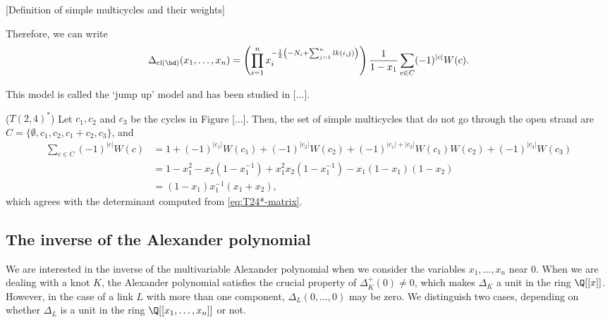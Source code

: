 \documentclass[11pt,e-only]{amsart}
\begin{document}
[Definition of simple multicycles and their weights]

Therefore, we can write
\begin{equation}
    \Delta_{\mathrm{cl}(\bd)}(x_1,\dots,x_n) = \left(\prod_{i=1}^n x_i^{-\frac{1}{2}\left(-N_i+\sum_{j=1}^n lk(i,j)\right)}\right) \frac{1}{1-x_1} \sum_{c\in C} (-1)^{|c|} W(c).
\end{equation}

This model is called the `jump up' model and has been studied in [...].

\begin{example}\label{ex:T24*-cycles} ($T(2,4)^*$) Let $c_1,c_2$ and $c_3$ be the cycles in Figure [...]. Then, the set of simple multicycles that do not go through the open strand are $C=\{\emptyset,c_1,c_2,c_1+c_2,c_3\}$, and
\begin{equation*}
\begin{split}
    \sum_{c\in C} (-1)^{|c|}W(c)&=1+(-1)^{|c_1|}W(c_1)+(-1)^{|c_2|}W(c_2)+(-1)^{|c_1|+|c_2|}W(c_1)W(c_2)+(-1)^{|c_3|}W(c_3)
    \\&=1-x_1^2-x_2(1-x_1^{-1})+x_1^2x_2(1-x_1^{-1})-x_1(1-x_1)(1-x_2)\\&=(1-x_1)x_1^{-1}(x_1+x_2),
\end{split}
\end{equation*}
which agrees with the determinant computed from \cref{eq:T24*-matrix}.
\end{example}

\subsection{The inverse of the Alexander polynomial}

We are interested in the inverse of the multivariable Alexander polynomial when we consider the variables $x_1,\dots,x_n$ near $0$. When we are dealing with a knot $K$, the Alexander polynomial satisfies the crucial property of \alert{$\Delta^+_K(0)\neq 0$}, which makes $\Delta_K$ a unit in the ring $\Q[[x]]$. However, in the case of a link $L$ with more than one component, $\Delta_L(0,\dots,0)$ may be zero. We distinguish two cases, depending on whether $\Delta_L$ is a unit in the ring $\Q[[x_1,\dots,x_n]]$ or not. 
\end{document}
